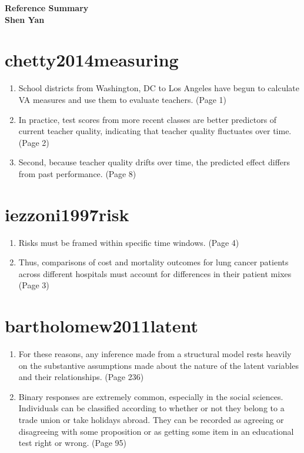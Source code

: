 \documentclass[11pt]{article}
\begin{document}
\begin{center}
\large \textbf{Reference Summary} \\
\normalsize \textbf{Shen Yan}
\end{center}

\section{chetty2014measuring}

\begin{enumerate}
  \item School districts from Washington, DC to Los Angeles have begun to calculate VA measures and use them to evaluate teachers. (Page 1)
  \item In practice, test scores from more recent classes are better predictors of current teacher quality, indicating that teacher quality fluctuates over time. (Page 2)
  \item Second, because teacher quality drifts over time, the predicted effect differs
from past performance. (Page 8)
\end{enumerate}

\section{iezzoni1997risk}

\begin{enumerate}
  \item Risks must be framed within specific time windows. (Page 4)
  \item Thus, comparisons of cost and mortality outcomes for lung cancer patients across different hospitals must account for differences in their patient mixes (Page 3)
\end{enumerate}

\section{bartholomew2011latent}

\begin{enumerate}
  \item For these reasons, any inference made from a structural model rests heavily on the substantive assumptions made about the nature of the latent variables and their relationships. (Page 236)
  \item Binary responses are extremely common, especially in the social sciences. Individuals can be classified according to whether or not they belong to a trade union or take holidays abroad. They can be recorded as agreeing or disagreeing with some proposition or as getting some item in an educational test right or wrong. (Page 95)
\end{enumerate}
\end{document}
